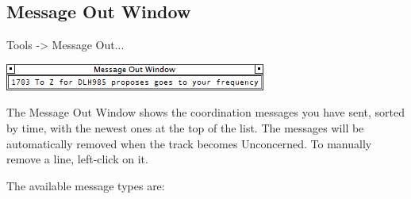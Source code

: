 \documentclass[11pt,a4paper]{memoir}
\begin{document}
\subsection{Message Out Window}
\label{win:mow}

\textit{} Tools -> Message Out...

\includegraphics{img/mow.png}

The Message Out Window shows the coordination messages you have sent, sorted by time, with the newest ones at the top of the list. The messages will be automatically removed when the track becomes Unconcerned. To manually remove a line, left-click on it.

The available message types are:
\end{document}
